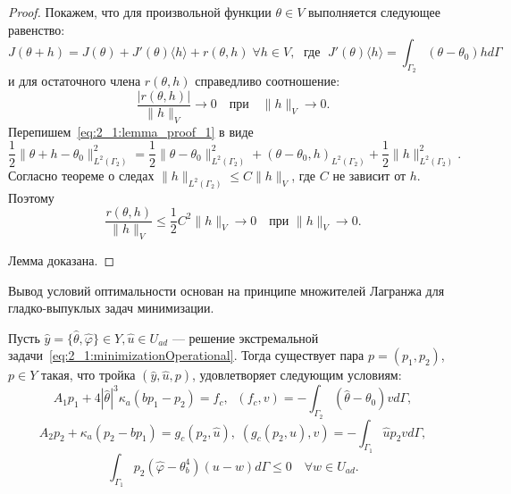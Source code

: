 \begin{proof}
    Покажем, что для произвольной функции $\theta \in V$ выполняется следующее равенство:
    \begin{equation}
        \label{eq:2_1:lemma_proof_1}
        J(\theta + h) = J(\theta) + J'(\theta)\langle h \rangle
        + r(\theta, h) \; \forall h \in V, \; \text{ где } \;
        J'(\theta)\langle h \rangle = \int_{\Gamma_2} (\theta - \theta_0)h d\Gamma
    \end{equation}
    и для остаточного члена $r(\theta,h)$ справедливо соотношение:
    \begin{equation}
        \label{eq:2_1:lemma_proof_2}
        \frac{|r(\theta,h)|}{\|h\|_V} \rightarrow 0
        \quad \text{при} \quad \|h\|_V \rightarrow 0.
    \end{equation}
    Перепишем~\eqref{eq:2_1:lemma_proof_1} в виде
    \[
        \frac{1}{2} \|\theta + h - \theta_0\|^2_{L^2(\Gamma_2)} =
        \frac{1}{2} \| \theta - \theta_0 \|^2_{L^2(\Gamma_2)} +
        (\theta - \theta_0, h)_{L^2(\Gamma_2)} +
        \frac{1}{2}\| h \|^2_{L^2(\Gamma_2)}.
    \]
    Согласно теореме о следах $ \|h\|_{L^2(\Gamma_2)} \le C \|h\|_V $,
    где $C$ не зависит от $h$.
    Поэтому
    \[
        \frac{r(\theta,h)}{\| h \|_V} \leq
        \frac{1}{2} C^2 \| h \|_V \rightarrow 0 \quad \text{при } \| h \|_V \rightarrow 0.
    \]

    Лемма доказана.
\end{proof}

Вывод условий оптимальности основан на принципе множителей
Лагранжа для гладко-выпуклых задач минимизации.
\begin{theorem}
    \label{th:2_1:2}
    Пусть $\hat{y}=\{\hat{\theta},\hat{\varphi} \} \in Y, \hat{u} \in U_{ad}$
    --- решение экстремальной задачи~\eqref{eq:2_1:minimizationOperational}.
    Тогда существует пара $p = (p_1, p_2)$, $p \in Y$
    такая, что тройка $(\hat{y}, \hat{u}, p)$, удовлетворяет следующим условиям:
    \begin{equation}
        \label{eq:2_1:therorem_2_eq1}
        A_1 p_1 + 4 |\hat{\theta}|^3 \kappa_a(b p_1 - p_2) = f_c,
        \;\; (f_c,v) = - \int_{\Gamma_2} (\hat{\theta} - \theta_0) v d\Gamma,
    \end{equation}
    \begin{equation}
        \label{eq:2_1:therorem_2_eq2}
        A_2 p_2 + \kappa_a (p_2-b p_1) = g_c(p_2, \hat{u}),
        \;(g_c(p_2, \hat{u}), v) = -\int_{\Gamma_1} \hat{u} p_2 v d\Gamma,
    \end{equation}
    \begin{equation}
        \label{eq:2_1:therorem_2_eq3}
        \int_{\Gamma_1} p_2 (\hat{\varphi} - \theta_b^4)(u-w) d\Gamma
        \leq 0 \quad \forall w \in U_{ad}.
    \end{equation}
\end{theorem}

